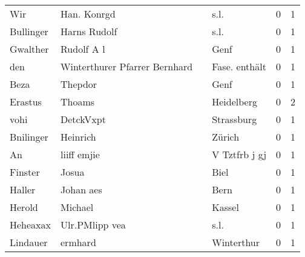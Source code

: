 \begin{center}
\begin{tiny}
\begin{longtabu}{llllrr}
                      Wir &                        Han. Konrgd &             &                                        s.l. &          0 &         1 \\
                Bullinger &                       Harns Rudolf &             &                                        s.l. &          0 &         1 \\
                 Gwalther &                         Rudolf A l &             &                                        Genf &          0 &         1 \\
                      den &      Winterthurer Pfarrer Bernhard &             &                               Fase. enthält &          0 &         1 \\
                     Beza &                            Thepdor &             &                                        Genf &          0 &         1 \\
                  Erastus &                             Thoams &             &                                  Heidelberg &          0 &         2 \\
                     vohi &                          DetckVxpt &             &                                  Strassburg &          0 &         1 \\
                Bnilinger &                           Heinrich &             &                                      Zürich &          0 &         1 \\
                       An &                        liiff emjie &             &                               V Tztfrb j gj &          0 &         1 \\
                  Finster &                              Josua &             &                                        Biel &          0 &         1 \\
                   Haller &                          Johan aes &             &                                        Bern &          0 &         1 \\
                   Herold &                            Michael &             &                                      Kassel &          0 &         1 \\
                 Heheaxax &                     Ulr.PMlipp vea &             &                                        s.l. &          0 &         1 \\
                 Lindauer &                            ermhard &             &                                  Winterthur &          0 &         1 \\

\end{longtabu}
\end{tiny}
\end{center}
